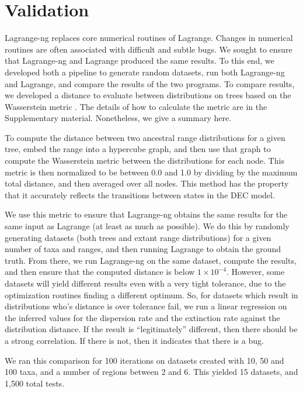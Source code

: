 \documentclass[oupdraft]{sysbio}
\begin{document}
\section{Validation}\label{sec:Validation}

Lagrange-ng replaces core numerical routines of Lagrange. Changes in numerical routines are often associated with
difficult and subtle bugs. We sought to ensure that Lagrange-ng and Lagrange produced the same results. To this end, we
developed both a pipeline to generate random datasets, run both Lagrange-ng and Lagrange, and compare the results of the
two programs. To compare results, we developed a distance to evaluate between distributions on trees based on the
Wasserstein metric \citep{vaserstein_markov_1969}. The details of how to calculate the metric are in the Supplementary
material. Nonetheless, we give a summary here.

To compute the distance between two ancestral range distributions for a given tree, embed the range into a hypercube
graph, and then use that graph to compute the Wasserstein metric between the distributions for each node. This metric is
then normalized to be between 0.0 and 1.0 by dividing by the maximum total distance, and then averaged over all nodes.
This method has the property that it accurately reflects the transitions between states in the DEC model.

We use this metric to ensure that Lagrange-ng obtains the same results for the same input as Lagrange (at least as much
as possible). We do this by randomly generating datasets (both trees and extant range distributions) for a given number
of taxa and ranges, and then running Lagrange to obtain the ground truth. From there, we run Lagrange-ng on the same
dataset, compute the results, and then ensure that the computed distance is below $1\times 10^{-4}$. However, some
datasets will yield different results even with a very tight tolerance, due to the optimization routines finding a
different optimum. So, for datasets which result in distributions who's distance is over tolerance fail, we run a linear
regression on the inferred values for the dispersion rate and the extinction rate against the distribution distance. If
the result is ``legitimately'' different, then there should be a strong correlation. If there is not, then it indicates
that there is a bug.

We ran this comparison for 100 iterations on datasets created with 10, 50 and 100 taxa, and a number of regions between
2 and 6. This yielded 15 datasets, and 1,500 total tests.
\end{document}
